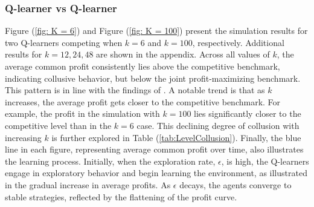 \documentclass{article}
\begin{document}
\subsubsection{Q-learner vs Q-learner}
\label{QvsQ}
Figure (\ref{fig: K = 6}) and Figure (\ref{fig: K = 100}) present the simulation results for two Q-learners competing when $ k = 6 $ and $ k = 100 $, respectively. Additional results for $ k = 12, 24, 48 $ are shown in the appendix. Across all values of $ k $, the average common profit consistently lies above the competitive benchmark, indicating collusive behavior, but below the joint profit-maximizing benchmark. This pattern is in line with the findings of \cite{Klein2021}.
\newline
A notable trend is that as $ k $ increases, the average profit gets closer to the competitive benchmark. For example, the profit in the simulation with $k = 100 $ lies significantly closer to the competitive level than in the $ k = 6 $ case. This declining degree of collusion with increasing $ k $ is further explored in Table (\ref{tab:LevelCollusion}).
\newline
Finally, the blue line in each figure, representing average common profit over time, also illustrates the learning process. Initially, when the exploration rate, $\epsilon$, is high, the Q-learners engage in exploratory behavior and begin learning the environment, as illustrated in the gradual increase in average profits. As $ \epsilon $ decays, the agents converge to stable strategies, reflected by the flattening of the profit curve.
\end{document}
